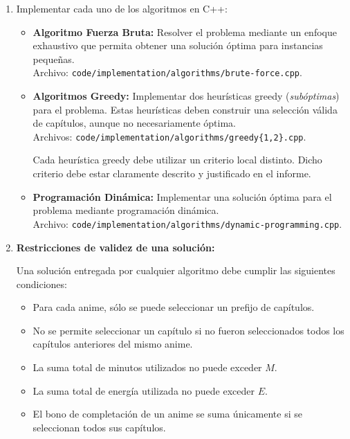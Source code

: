 \begin{enumerate}[(1)]
    \item Implementar cada uno de los algoritmos en C++:

    \begin{itemize}
        \item \textbf{Algoritmo Fuerza Bruta:} Resolver el problema mediante un enfoque exhaustivo que permita obtener una solución óptima para instancias pequeñas. \\
        Archivo: \texttt{code/implementation/algorithms/brute-force.cpp}.
        
        \item \textbf{Algoritmos Greedy:} Implementar dos heurísticas greedy (\textit{subóptimas}) para el problema. Estas heurísticas deben construir una selección válida de capítulos, aunque no necesariamente óptima. \\
        Archivos: \texttt{code/implementation/algorithms/greedy\{1,2\}.cpp}.

        Cada heurística greedy debe utilizar un criterio local distinto. Dicho criterio debe estar claramente descrito y justificado en el informe.
        
        \item \textbf{Programación Dinámica:} Implementar una solución óptima para el problema mediante programación dinámica. \\
        Archivo: \texttt{code/implementation/algorithms/dynamic-programming.cpp}.
    \end{itemize}

    \item \textbf{Restricciones de validez de una solución:}

    Una solución entregada por cualquier algoritmo debe cumplir las siguientes condiciones:

    \begin{itemize}
        \item Para cada anime, sólo se puede seleccionar un prefijo de capítulos.
        \item No se permite seleccionar un capítulo si no fueron seleccionados todos los capítulos anteriores del mismo anime.
        \item La suma total de minutos utilizados no puede exceder $M$.
        \item La suma total de energía utilizada no puede exceder $E$.
        \item El bono de completación de un anime se suma únicamente si se seleccionan todos sus capítulos.
    \end{itemize}


\end{enumerate}
